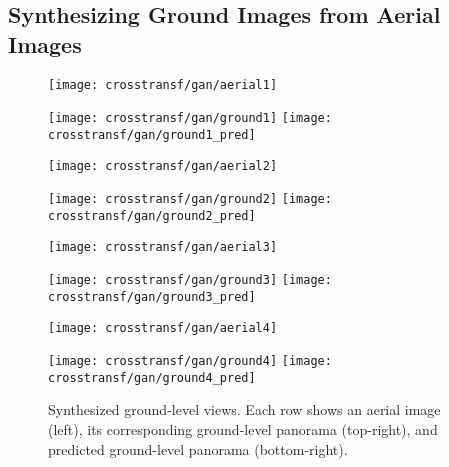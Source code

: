 \subsection{Synthesizing Ground Images from Aerial Images}

\begin{figure}
	\newlength{\awidth}
	\setlength{\awidth}{.279\linewidth}
	\setlength{\gwidth}{.67725\linewidth}
	\setlength{\gspace}{4pt}
	\centering
	\texttt{[image: crosstransf/gan/aerial1]}\hspace*{\gspace}
	\begin{minipage}[b]{\gwidth}
	\texttt{[image: crosstransf/gan/ground1]}\vfill
	\vspace*{\gspace}
	\texttt{[image: crosstransf/gan/ground1\_pred]}
	\end{minipage}\vspace*{\gspace}
	
	\texttt{[image: crosstransf/gan/aerial2]}\hspace*{\gspace}
	\begin{minipage}[b]{\gwidth}
	\texttt{[image: crosstransf/gan/ground2]}\vfill
	\vspace*{\gspace}
	\texttt{[image: crosstransf/gan/ground2\_pred]}
	\end{minipage}\vspace*{\gspace}
	
	\texttt{[image: crosstransf/gan/aerial3]}\hspace*{\gspace}
	\begin{minipage}[b]{\gwidth}
	\texttt{[image: crosstransf/gan/ground3]}\vfill
	\vspace*{\gspace}
	\texttt{[image: crosstransf/gan/ground3\_pred]}
	\end{minipage}\vspace*{\gspace}
	
	\texttt{[image: crosstransf/gan/aerial4]}\hspace*{\gspace}
	\begin{minipage}[b]{\gwidth}
	\texttt{[image: crosstransf/gan/ground4]}\vfill
	\vspace*{\gspace}
	\texttt{[image: crosstransf/gan/ground4\_pred]}
	\end{minipage}

	\caption{Synthesized ground-level views. Each row shows an aerial image 
	(left), its corresponding ground-level panorama (top-right), and predicted 
	ground-level panorama (bottom-right).}
	\label{fig:gan}
\end{figure}

